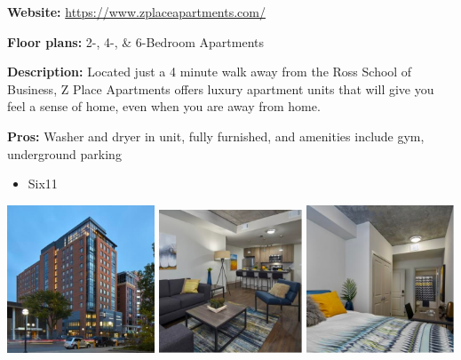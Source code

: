 \documentclass[
]{book}
\providecommand{\tightlist}{%
  \setlength{\itemsep}{0pt}\setlength{\parskip}{0pt}}
\begin{document}
\textbf{Website:} \url{https://www.zplaceapartments.com/}

\textbf{Floor plans:} 2-, 4-, \& 6-Bedroom Apartments

\textbf{Description:} Located just a 4 minute walk away from the Ross School of Business, Z Place Apartments offers luxury apartment units that will give you feel a sense of home, even when you are away from home.

\textbf{Pros:} Washer and dryer in unit, fully furnished, and amenities include gym, underground parking

\begin{itemize}
\tightlist
\item
  Six11
\end{itemize}

\includegraphics[width=0.33\textwidth,height=\textheight]{611_exterior.png}
\includegraphics[width=0.32\textwidth,height=\textheight]{611_interior1.png}
\includegraphics[width=0.33\textwidth,height=\textheight]{611_interior2.png}
\end{document}
